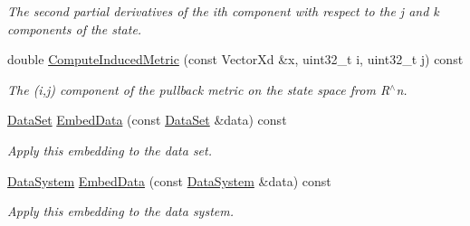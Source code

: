 \begin{DoxyCompactItemize}
\begin{DoxyCompactList}\small\item\em The second partial derivatives of the ith component with respect to the j and k components of the state. \end{DoxyCompactList}\item 
\hypertarget{struct_d_r_d_s_p_1_1_embedding_c_w_a7fc6f574011396ef14a775e02fb7ef25}{double \hyperlink{struct_d_r_d_s_p_1_1_embedding_c_w_a7fc6f574011396ef14a775e02fb7ef25}{Compute\-Induced\-Metric} (const Vector\-Xd \&x, uint32\-\_\-t i, uint32\-\_\-t j) const }\label{struct_d_r_d_s_p_1_1_embedding_c_w_a7fc6f574011396ef14a775e02fb7ef25}

\begin{DoxyCompactList}\small\item\em The (i,j) component of the pullback metric on the state space from R$^\wedge$n. \end{DoxyCompactList}\item 
\hypertarget{struct_d_r_d_s_p_1_1_embedding_c_w_ad63dfe0eeab18767684e46cd3000ef83}{\hyperlink{struct_d_r_d_s_p_1_1_data_set}{Data\-Set} \hyperlink{struct_d_r_d_s_p_1_1_embedding_c_w_ad63dfe0eeab18767684e46cd3000ef83}{Embed\-Data} (const \hyperlink{struct_d_r_d_s_p_1_1_data_set}{Data\-Set} \&data) const }\label{struct_d_r_d_s_p_1_1_embedding_c_w_ad63dfe0eeab18767684e46cd3000ef83}

\begin{DoxyCompactList}\small\item\em Apply this embedding to the data set. \end{DoxyCompactList}\item 
\hypertarget{struct_d_r_d_s_p_1_1_embedding_c_w_a3ac7659dca082002fef531dd9403ee1f}{\hyperlink{struct_d_r_d_s_p_1_1_data_system}{Data\-System} \hyperlink{struct_d_r_d_s_p_1_1_embedding_c_w_a3ac7659dca082002fef531dd9403ee1f}{Embed\-Data} (const \hyperlink{struct_d_r_d_s_p_1_1_data_system}{Data\-System} \&data) const }\label{struct_d_r_d_s_p_1_1_embedding_c_w_a3ac7659dca082002fef531dd9403ee1f}

\begin{DoxyCompactList}\small\item\em Apply this embedding to the data system. \end{DoxyCompactList}\end{DoxyCompactItemize}
